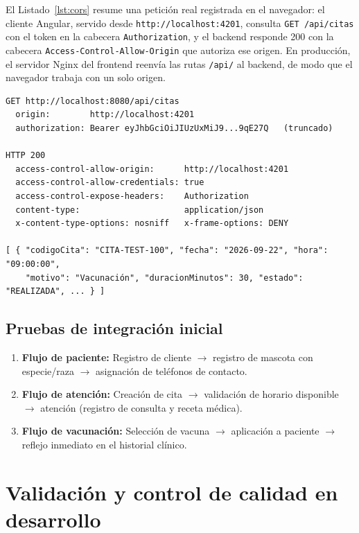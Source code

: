 \documentclass[11pt,a4paper]{report}
\begin{document}
El Listado~\ref{lst:cors} resume una petición real registrada en el navegador: el cliente Angular, servido desde \texttt{http://localhost:4201}, consulta \texttt{GET /api/citas} con el token en la cabecera \texttt{Authorization}, y el backend responde 200 con la cabecera \texttt{Access-Control-Allow-Origin} que autoriza ese origen. En producción, el servidor Nginx del frontend reenvía las rutas \texttt{/api/} al backend, de modo que el navegador trabaja con un solo origen.

\begin{lstlisting}[style=codigoreal, numbers=none, caption={Petición autenticada entre el cliente Angular y el backend Spring Boot con cabeceras CORS (extracto)}, label={lst:cors}]
GET http://localhost:8080/api/citas
  origin:        http://localhost:4201
  authorization: Bearer eyJhbGciOiJIUzUxMiJ9...9qE27Q   (truncado)

HTTP 200
  access-control-allow-origin:      http://localhost:4201
  access-control-allow-credentials: true
  access-control-expose-headers:    Authorization
  content-type:                     application/json
  x-content-type-options: nosniff   x-frame-options: DENY

[ { "codigoCita": "CITA-TEST-100", "fecha": "2026-09-22", "hora": "09:00:00",
    "motivo": "Vacunación", "duracionMinutos": 30, "estado": "REALIZADA", ... } ]
\end{lstlisting}

\subsection{Pruebas de integración inicial}
\begin{enumerate}[label=\arabic*.]
\item \textbf{Flujo de paciente:} Registro de cliente $\rightarrow$ registro de mascota con especie/raza $\rightarrow$ asignación de teléfonos de contacto.
\item \textbf{Flujo de atención:} Creación de cita $\rightarrow$ validación de horario disponible $\rightarrow$ atención (registro de consulta y receta médica).
\item \textbf{Flujo de vacunación:} Selección de vacuna $\rightarrow$ aplicación a paciente $\rightarrow$ reflejo inmediato en el historial clínico.
\end{enumerate}

\section{Validación y control de calidad en desarrollo}
\end{document}
